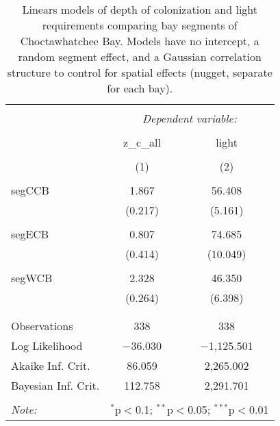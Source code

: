\documentclass[letterpaper,12pt]{article}\usepackage[]{graphicx}\usepackage[]{color}
\begin{document}
\begin{table}[!htbp] \centering 
  \caption{Linears models of depth of colonization and light requirements comparing bay segments of Choctawhatchee Bay.  Models have no intercept, a random segment effect, and a Gaussian correlation structure to control for spatial effects (nugget, separate for each bay).} 
  \label{} 
\begin{tabular}{@{\extracolsep{5pt}}lcc} 
\\[-1.8ex]\hline 
\hline \\[-1.8ex] 
 & \multicolumn{2}{c}{\textit{Dependent variable:}} \\ 
\cline{2-3} 
\\[-1.8ex] & z\_c\_all & light \\ 
\\[-1.8ex] & (1) & (2)\\ 
\hline \\[-1.8ex] 
 segCCB & 1.867 & 56.408 \\ 
  & (0.217) & (5.161) \\ 
  & & \\ 
 segECB & 0.807 & 74.685 \\ 
  & (0.414) & (10.049) \\ 
  & & \\ 
 segWCB & 2.328 & 46.350 \\ 
  & (0.264) & (6.398) \\ 
  & & \\ 
\hline \\[-1.8ex] 
Observations & 338 & 338 \\ 
Log Likelihood & $-$36.030 & $-$1,125.501 \\ 
Akaike Inf. Crit. & 86.059 & 2,265.002 \\ 
Bayesian Inf. Crit. & 112.758 & 2,291.701 \\ 
\hline 
\hline \\[-1.8ex] 
\textit{Note:}  & \multicolumn{2}{r}{$^{*}$p$<$0.1; $^{**}$p$<$0.05; $^{***}$p$<$0.01} \\ 
\end{tabular} 
\end{table} 
\end{document}
